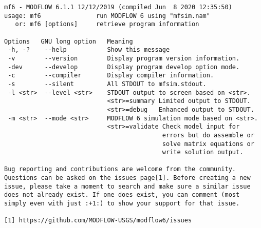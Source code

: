 {\small
\begin{lstlisting}[style=modeloutput]
mf6 - MODFLOW 6.1.1 12/12/2019 (compiled Jun  8 2020 12:35:50)
usage: mf6               run MODFLOW 6 using "mfsim.nam"
   or: mf6 [options]     retrieve program information

Options   GNU long option   Meaning 
 -h, -?    --help           Show this message
 -v        --version        Display program version information.
 -dev      --develop        Display program develop option mode.
 -c        --compiler       Display compiler information.
 -s        --silent         All STDOUT to mfsim.stdout.
 -l <str>  --level <str>    STDOUT output to screen based on <str>.
                            <str>=summary Limited output to STDOUT.
                            <str>=debug   Enhanced output to STDOUT.
 -m <str>  --mode <str>     MODFLOW 6 simulation mode based on <str>.
                            <str>=validate Check model input for
                                           errors but do assemble or
                                           solve matrix equations or
                                           write solution output.
                                                                    
Bug reporting and contributions are welcome from the community. 
Questions can be asked on the issues page[1]. Before creating a new
issue, please take a moment to search and make sure a similar issue
does not already exist. If one does exist, you can comment (most
simply even with just :+1:) to show your support for that issue.
                                                                    
[1] https://github.com/MODFLOW-USGS/modflow6/issues
\end{lstlisting}
}
